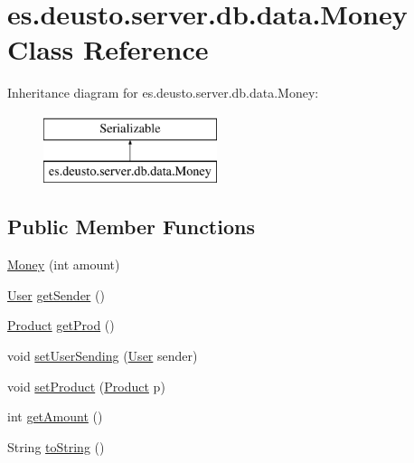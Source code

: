 \hypertarget{classes_1_1deusto_1_1server_1_1db_1_1data_1_1_money}{}\section{es.\+deusto.\+server.\+db.\+data.\+Money Class Reference}
\label{classes_1_1deusto_1_1server_1_1db_1_1data_1_1_money}
Inheritance diagram for es.\+deusto.\+server.\+db.\+data.\+Money\+:\begin{figure}[H]
\begin{center}
\leavevmode
\includegraphics[height=2.000000cm]{classes_1_1deusto_1_1server_1_1db_1_1data_1_1_money}
\end{center}
\end{figure}
\subsection*{Public Member Functions}
\begin{DoxyCompactItemize}
\item 
\hyperlink{classes_1_1deusto_1_1server_1_1db_1_1data_1_1_money_a25df7b8a67c257434bf09b7d8e7e2dbd}{Money} (int amount)
\item 
\hyperlink{classes_1_1deusto_1_1server_1_1db_1_1data_1_1_user}{User} \hyperlink{classes_1_1deusto_1_1server_1_1db_1_1data_1_1_money_a4e51e8a920ff96f945c59693c7bf08ad}{get\+Sender} ()
\item 
\hyperlink{classes_1_1deusto_1_1server_1_1db_1_1data_1_1_product}{Product} \hyperlink{classes_1_1deusto_1_1server_1_1db_1_1data_1_1_money_ab907da0a2fa2c7d42034f323ff1d86a7}{get\+Prod} ()
\item 
void \hyperlink{classes_1_1deusto_1_1server_1_1db_1_1data_1_1_money_ad5e5b686cbe1ce6e631915f40ef70892}{set\+User\+Sending} (\hyperlink{classes_1_1deusto_1_1server_1_1db_1_1data_1_1_user}{User} sender)
\item 
void \hyperlink{classes_1_1deusto_1_1server_1_1db_1_1data_1_1_money_a494f3b9ca18e88ca4b96e9c8d90e0557}{set\+Product} (\hyperlink{classes_1_1deusto_1_1server_1_1db_1_1data_1_1_product}{Product} p)
\item 
int \hyperlink{classes_1_1deusto_1_1server_1_1db_1_1data_1_1_money_a6f9db9361544c72ecaa89ec27309645d}{get\+Amount} ()
\item 
String \hyperlink{classes_1_1deusto_1_1server_1_1db_1_1data_1_1_money_a97d3500731b427992e9e40dcc0f0442d}{to\+String} ()
\end{DoxyCompactItemize}


